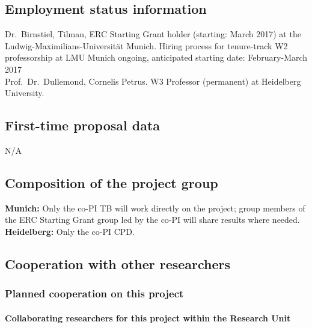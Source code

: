 \documentclass[10pt,fleqn,twoside]{article}
\begin{document}
\subsection{Employment status information}


Dr.~Birnstiel, Tilman, ERC Starting Grant holder (starting: March 2017) at
the Ludwig-Maximilians-Universit\"at Munich. Hiring process for tenure-track W2
professorship at LMU Munich ongoing, anticipated starting date: February-March
2017\\
Prof.~Dr.~Dullemond, Cornelis Petrus.
W3 Professor (permanent) at Heidelberg University.


\subsection{First-time proposal data}

N/A

\subsection{Composition of the project group}
\textbf{Munich:} Only the co-PI TB will work directly on the project; group
members of the ERC Starting Grant group led by the co-PI will share results where
needed.\\
\textbf{Heidelberg:} Only the co-PI CPD.

\subsection{Cooperation with other researchers}

\subsubsection{Planned cooperation on this project}

\paragraph{Collaborating researchers for this project within the
  Research Unit}
\end{document}
